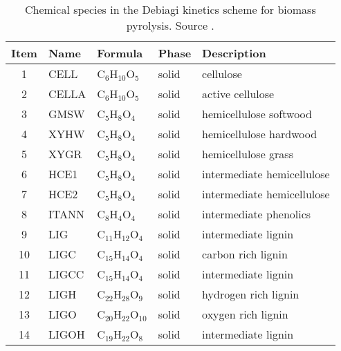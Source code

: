 \begin{center}
    \footnotesize
    \begin{longtable}{cllll}
        \caption{Chemical species in the Debiagi kinetics scheme for biomass pyrolysis. Source \cite{Debiagi-2018}.}
        \label{tab:chem-species} \\
        \toprule
        Item & Name & Formula & Phase & Description \\
        \midrule
        1  & CELL           & C$_6$H$_{10}$O$_5$      & \cellcolor{green!25}solid        & cellulose \\
        2  & CELLA          & C$_6$H$_{10}$O$_5$      & \cellcolor{green!25}solid        & active cellulose \\
        3  & GMSW           & C$_5$H$_{8}$O$_4$       & \cellcolor{green!25}solid        & hemicellulose softwood \\
        4  & XYHW           & C$_5$H$_{8}$O$_4$       & \cellcolor{green!25}solid        & hemicellulose hardwood \\
        5  & XYGR           & C$_5$H$_{8}$O$_4$       & \cellcolor{green!25}solid        & hemicellulose grass \\
        6  & HCE1           & C$_5$H$_{8}$O$_4$       & \cellcolor{green!25}solid        & intermediate hemicellulose \\
        7  & HCE2           & C$_5$H$_{8}$O$_4$       & \cellcolor{green!25}solid        & intermediate hemicellulose \\
        8  & ITANN          & C$_8$H$_{4}$O$_4$       & \cellcolor{green!25}solid        & intermediate phenolics \\
        9  & LIG            & C$_{11}$H$_{12}$O$_4$   & \cellcolor{green!25}solid        & intermediate lignin \\
        10 & LIGC           & C$_{15}$H$_{14}$O$_4$   & \cellcolor{green!25}solid        & carbon rich lignin \\
        11 & LIGCC          & C$_{15}$H$_{14}$O$_4$   & \cellcolor{green!25}solid        & intermediate lignin \\
        12 & LIGH           & C$_{22}$H$_{28}$O$_9$   & \cellcolor{green!25}solid        & hydrogen rich lignin \\
        13 & LIGO           & C$_{20}$H$_{22}$O$_{10}$& \cellcolor{green!25}solid        & oxygen rich lignin \\
        14 & LIGOH          & C$_{19}$H$_{22}$O$_8$   & \cellcolor{green!25}solid        & intermediate lignin \\

\end{longtable}
\end{center}
